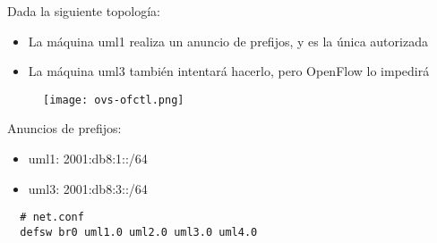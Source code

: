 
Dada la siguiente topología:

\begin{itemize}
  \item La máquina uml1 realiza un anuncio de prefijos, y es la única
  autorizada
  \item La máquina uml3 también intentará hacerlo, pero OpenFlow lo impedirá
\end{itemize}

\begin{figure}[h]
  \texttt{[image: ovs-ofctl.png]}
  \centering
\end{figure}

Anuncios de prefijos:

\begin{itemize}
  \item uml1: 2001:db8:1::/64
  \item uml3: 2001:db8:3::/64
\end{itemize}

\begin{verbatim}
  # net.conf
  defsw br0 uml1.0 uml2.0 uml3.0 uml4.0
\end{verbatim}


